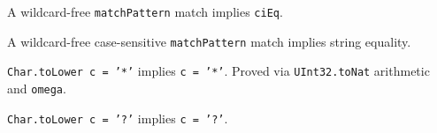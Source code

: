 \begin{theorem}\label{thm:matchPattern_literal_mp}
\leanok
A wildcard-free \texttt{matchPattern} match implies \texttt{ciEq}.
\end{theorem}

\begin{theorem}\label{thm:matchPattern_cs_literal_eq}
\leanok
A wildcard-free case-sensitive \texttt{matchPattern} match implies string equality.
\end{theorem}

\begin{lemma}\label{lem:toLower_eq_star}
\leanok
\texttt{Char.toLower c = '*'} implies \texttt{c = '*'}.
Proved via \texttt{UInt32.toNat} arithmetic and \texttt{omega}.
\end{lemma}

\begin{lemma}\label{lem:toLower_eq_question}
\leanok
\texttt{Char.toLower c = '?'} implies \texttt{c = '?'}.
\end{lemma}
